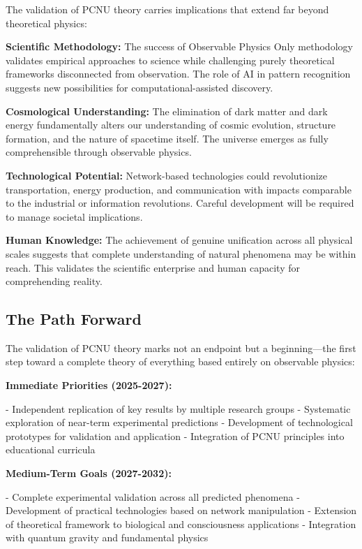 \documentclass[11pt,a4paper]{article}
\begin{document}
The validation of PCNU theory carries implications that extend far beyond theoretical physics:

\textbf{Scientific Methodology:}
The success of Observable Physics Only methodology validates empirical approaches to science while challenging purely theoretical frameworks disconnected from observation. The role of AI in pattern recognition suggests new possibilities for computational-assisted discovery.

\textbf{Cosmological Understanding:}
The elimination of dark matter and dark energy fundamentally alters our understanding of cosmic evolution, structure formation, and the nature of spacetime itself. The universe emerges as fully comprehensible through observable physics.

\textbf{Technological Potential:}
Network-based technologies could revolutionize transportation, energy production, and communication with impacts comparable to the industrial or information revolutions. Careful development will be required to manage societal implications.

\textbf{Human Knowledge:}
The achievement of genuine unification across all physical scales suggests that complete understanding of natural phenomena may be within reach. This validates the scientific enterprise and human capacity for comprehending reality.

\subsection{The Path Forward}

The validation of PCNU theory marks not an endpoint but a beginning—the first step toward a complete theory of everything based entirely on observable physics:

\textbf{Immediate Priorities (2025-2027):}

- Independent replication of key results by multiple research groups
- Systematic exploration of near-term experimental predictions
- Development of technological prototypes for validation and application
- Integration of PCNU principles into educational curricula

\textbf{Medium-Term Goals (2027-2032):}

- Complete experimental validation across all predicted phenomena
- Development of practical technologies based on network manipulation
- Extension of theoretical framework to biological and consciousness applications
- Integration with quantum gravity and fundamental physics
\end{document}
